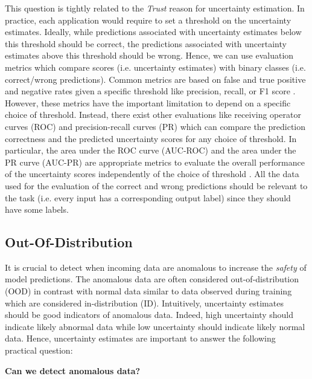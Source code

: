 This question is tightly related to the \emph{Trust} reason for uncertainty estimation. In practice, each application would require to set a threshold on the uncertainty estimates. Ideally, while predictions associated with uncertainty estimates below this threshold should be correct, the predictions associated with uncertainty estimates above this threshold should be wrong. Hence, we can use evaluation metrics which compare scores (i.e. uncertainty estimates) with binary classes (i.e. correct/wrong predictions). Common metrics are based on false and true positive and negative rates given a specific threshold like precision, recall, or F1 score \cite{powers2011evaluation}. However, these metrics have the important limitation to depend on a specific choice of threshold. Instead, there exist other evaluations like receiving operator curves (ROC) and precision-recall curves (PR) which can compare the prediction correctness and the predicted uncertainty scores for any choice of threshold. In particular, the area under the ROC curve (AUC-ROC) and the area under the PR curve (AUC-PR) are appropriate metrics to evaluate the overall performance of the uncertainty scores independently of the choice of threshold \cite{apr_auroc}. All the data used for the evaluation of the correct and wrong predictions should be relevant to the task (i.e. every input has a corresponding output label) since they should have some labels.

\subsection{Out-Of-Distribution}

It is crucial to detect when incoming data are anomalous to increase the \emph{safety} of model predictions. The anomalous data are often considered out-of-distribution (OOD) in contrast with normal data similar to data observed during training which are considered in-distribution (ID). Intuitively, uncertainty estimates should be good indicators of anomalous data. Indeed, high uncertainty should indicate likely abnormal data while low uncertainty should indicate likely normal data. Hence, uncertainty estimates are important to answer the following practical question:

\begin{center}
    \textbf{Can we detect anomalous data?}
\end{center}

